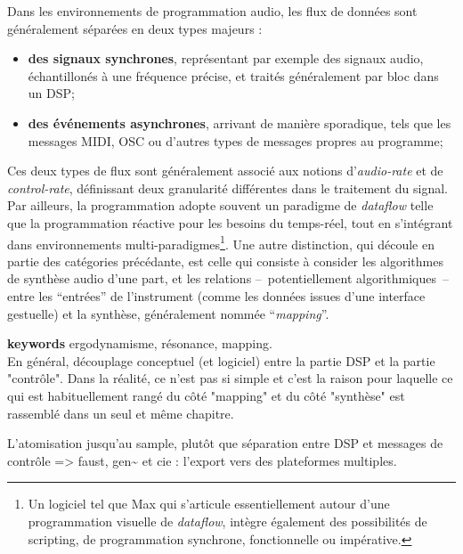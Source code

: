 \noindent Dans les environnements de programmation audio, les flux de données sont généralement séparées en deux types majeurs : 
\vspace{-1em}
\begin{itemize}[noitemsep]
	\item \textbf{des signaux synchrones}, représentant par exemple des signaux audio, échantillonés à une fréquence précise, et traités généralement par bloc dans un \gls{DSP};
	\item \textbf{des événements asynchrones}, arrivant de manière sporadique, tels que les messages \gls{MIDI}, \gls{OSC} ou d'autres types de messages propres au programme;
\end{itemize}

\noindent Ces deux types de flux sont généralement associé aux notions d'\textit{audio-rate} et de \textit{control-rate}, définissant deux granularité différentes dans le traitement du signal. Par ailleurs, la programmation adopte souvent un paradigme de \textit{dataflow} telle que la programmation réactive pour les besoins du temps-réel, tout en s'intégrant dans environnements multi-paradigmes\footnote{Un logiciel tel que Max qui s'articule essentiellement autour d'une programmation visuelle de \textit{dataflow}, intègre également des possibilités de scripting, de programmation synchrone, fonctionnelle ou impérative.}.
\indent Une autre distinction, qui découle en partie des catégories précédante, est celle qui consiste à consider les algorithmes de synthèse audio d'une part, et les relations --~potentiellement algorithmiques~-- entre les ``entrées'' de l'instrument (comme les données issues d'une interface gestuelle) et la synthèse, généralement nommée ``\textit{mapping}''.


\textbf{keywords} ergodynamisme, résonance, mapping.\\

En général, découplage conceptuel (et logiciel) entre la partie DSP et la partie "contrôle". Dans la réalité, ce n'est pas si simple et c'est la raison pour laquelle ce qui est habituellement rangé du côté "mapping" et du côté "synthèse" est rassemblé dans un seul et même chapitre.



L’atomisation jusqu’au sample, plutôt que séparation entre DSP et messages de contrôle
=> faust, gen\textasciitilde{ } et cie : l’export vers des plateformes multiples.

